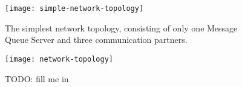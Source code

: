 \begin{figure}[ht]
  \centering
  \texttt{[image: simple-network-topology]}
  \caption[Network  Topology   (simple)]{The  simplest  network  topology,
    consisting of  only one Message  Queue Server and  three communication
    partners.}
  \label{fig:simple-net-top}
\end{figure}

\begin{figure}[ht]
  \centering
  \texttt{[image: network-topology]}
  \caption[Network  Topology]{TODO: fill me in}
  \label{fig:net-top}
\end{figure}

